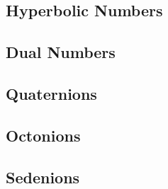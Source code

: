 




\subsection{Hyperbolic Numbers}

\subsection{Dual Numbers}

\subsection{Quaternions}

\subsection{Octonions}

\subsection{Sedenions}







\begin{comment}

-Frame the algebras of hypercomplex numbers as (representably by) particular subsets of
 the set of matrices. That's why we put it into the linear algebra chapter.
 
https://mathworld.wolfram.com/HypercomplexNumber.html
https://en.wikipedia.org/wiki/Hypercomplex_number

 

\end{comment}